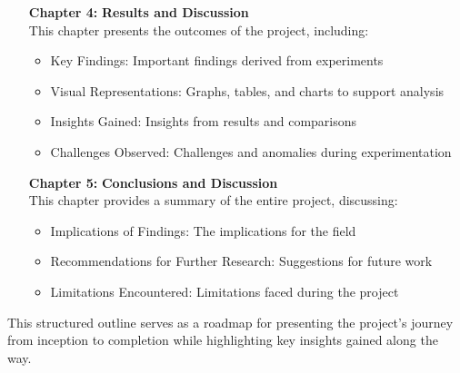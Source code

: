 \begin{itemize}[leftmargin=2.15cm, labelwidth=1.5cm]
    \item[\textbf{Chapter 4:}] \textbf{Results and Discussion}\\
    This chapter presents the outcomes of the project, including:
    \begin{itemize}
        \item Key Findings: Important findings derived from experiments
        \item Visual Representations: Graphs, tables, and charts to support analysis
        \item Insights Gained: Insights from results and comparisons
        \item Challenges Observed: Challenges and anomalies during experimentation
    \end{itemize}

    \item[\textbf{Chapter 5:}] \textbf{Conclusions and Discussion}\\
    This chapter provides a summary of the entire project, discussing:
    \begin{itemize}
        \item Implications of Findings: The implications for the field
        \item Recommendations for Further Research: Suggestions for future work
        \item Limitations Encountered: Limitations faced during the project
    \end{itemize}
\end{itemize}


    
    This structured outline serves as a roadmap for presenting the project's journey from inception to completion while highlighting key insights gained along the way.

